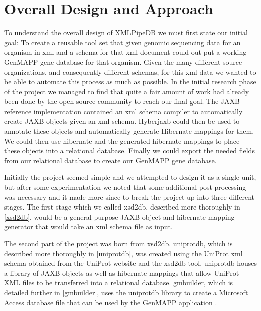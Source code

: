 \section{Overall Design and Approach}
To understand the overall design of XMLPipeDB we must first state our initial 
goal:  To create a reusable tool set that given genomic sequencing data for 
an organism in xml and a schema for that xml document could out put a working 
GenMAPP gene database for that organism.  Given the many different source 
organizations, and consequently different schemas,  for this xml data we 
wanted to be able to automate this process as much as possible.  In the 
initial research phase of the project we managed to find that quite a fair 
amount of work had already been done by the open source community to reach 
our final goal.  The JAXB reference implementation contained an xml schema 
compiler to automatically create JAXB objects given an xml schema.   
Hyberjaxb could then be used to annotate these objects and automatically 
generate Hibernate mappings for them.  We could then use hibernate and 
the generated hibernate mappings to place these objects into a relational  
database.  Finally we could export the needed fields from our relational 
database to create our GenMAPP gene database. 

Initially the project seemed simple and we attempted to design it as a 
single unit, but after some experimentation we noted that some additional 
post processing was necessary and it made more since to break the project 
up into three different stages.  The first stage which we called xsd2db, 
described more thoroughly in \ref{xsd2db}, would be a general purpose JAXB 
object and hibernate mapping generator that would take an xml schema file 
as input.   


The second part of the project was born from xsd2db.  uniprotdb, 
which is described more thoroughly in \ref{uniprotdb},
was created 
using the UniProt xml schema obtained from the UniProt website \cite{uniprotWeb}
and the xsd2db tool.  
uniprotdb houses a library of JAXB objects as well as hibernate 
mappings \cite{hyperjaxb}
that allow UniProt XML files to be transferred into a relational database.  
gmbuilder, which is detailed further in \ref{gmbuilder}, uses the uniprotdb
library to create a Microsoft Access database file that can be used by 
the GenMAPP application \cite{genmapp:ng}.  